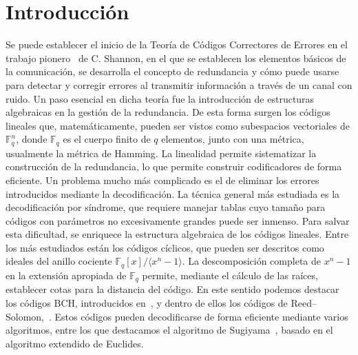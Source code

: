 %


\chapter{Introducción}

Se puede establecer el inicio de la Teoría de Códigos Correctores de Errores en el trabajo pionero~\cite{Shannon_1948} de C. Shannon, en el que se establecen los elementos básicos de la comunicación, se desarrolla el concepto de redundancia y cómo puede usarse para detectar y corregir errores al transmitir información a través de un canal con ruido. Un paso esencial en dicha teoría fue la introducción de estructuras algebraicas en la gestión de la redundancia. De esta forma surgen los códigos lineales que, matemáticamente, pueden ser vistos como subespacios vectoriales de $\mathbb{F}_q^n$, donde $\mathbb{F}_q$ es el cuerpo finito de $q$ elementos, junto con una métrica, usualmente la métrica de Hamming. La linealidad permite sistematizar la construcción de la redundancia, lo que permite construir codificadores de forma eficiente. Un problema mucho más complicado es el de eliminar los errores introducidos mediante la decodificación. La técnica general más estudiada es la decodificación por síndrome, que requiere manejar tablas cuyo tamaño para códigos con parámetros no excesivamente grandes puede ser inmenso. Para salvar esta dificultad, se enriquece la estructura algebraica de los códigos lineales. Entre los más estudiados están los códigos cíclicos, que pueden ser descritos como ideales del anillo cociente $\mathbb{F}_q[x]/\langle x^n -1 \rangle$. La descomposición completa de $x^n-1$ en la extensión apropiada de \(\mathbb{F}_q\) permite, mediante el cálculo de las raíces, establecer cotas para la distancia del código. En este sentido podemos destacar los códigos BCH, introducidos en~\cite{hocquenghem1959codes,bose1960class,bose1960further}, y dentro de ellos los códigos de Reed--Solomon,~\cite{ReedSolomon_1960}. Estos códigos pueden decodificarse de forma eficiente mediante varios algoritmos, entre los que destacamos el algoritmo de Sugiyama~\cite{Sugiyama_1975}, basado en el algoritmo extendido de Euclides.

